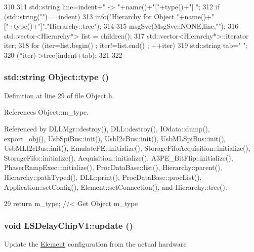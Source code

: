 \begin{DoxyCode}
310                                     {
311   std::string line=indent+" -> "+name()+"["+type()+"] ";
312   if (std::string("")==indent){
313     info("Hierarchy for Object "+name()+"["+type()+"]","Hierarchy::tree");
314   }
315   msgSvc(MsgSvc::NONE,line,"");
316   std::vector<Hierarchy*> list = children();
317   std::vector<Hierarchy*>::iterator iter;
318   for (iter=list.begin() ; iter!=list.end() ; ++iter){
319     std::string tab="  ";
320     (*iter)->tree(indent+tab);
321   }
322 }
\end{DoxyCode}
\hypertarget{classObject_a84f99f70f144a83e1582d1d0f84e4e62}{
\subsubsection[{type}]{\setlength{\rightskip}{0pt plus 5cm}std::string Object::type ()}}
\label{classObject_a84f99f70f144a83e1582d1d0f84e4e62}


Definition at line 29 of file Object.h.

References Object::m\_\-type.

Referenced by DLLMgr::destroy(), DLL::destroy(), IOdata::dump(), export\_\-obj(), UsbSpiBus::init(), UsbI2cBus::init(), UsbMLSpiBus::init(), UsbMLI2cBus::init(), EmulateFE::initialize(), StorageFifoAcquisition::initialize(), StorageFifo::initialize(), Acquisition::initialize(), A3PE\_\-BitFlip::initialize(), PhaserRampExec::initialize(), ProcDataBase::list(), Hierarchy::parent(), Hierarchy::pathTyped(), DLL::print(), ProcDataBase::procList(), Application::setConfig(), Element::setConnection(), and Hierarchy::tree().


\begin{DoxyCode}
29 { return m_type;       } //< Get Object m_type
\end{DoxyCode}
\hypertarget{classLSDelayChipV1_a7d4eb6fb7ca527286d36f30123bfd60a}{
\subsubsection[{update}]{\setlength{\rightskip}{0pt plus 5cm}void LSDelayChipV1::update ()}}
\label{classLSDelayChipV1_a7d4eb6fb7ca527286d36f30123bfd60a}
Update the \hyperlink{classElement}{Element} configuration from the actual hardware 

